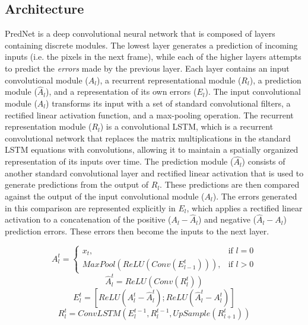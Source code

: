 \documentclass[12pt,twoside]{article}
\newif\myifpdf
\begin{document}
\subsection{Architecture}

PredNet is a deep convolutional neural network that is composed of layers containing discrete modules. The lowest layer generates a prediction of incoming inputs (i.e. the pixels in the next frame), while each of the higher layers attempts to predict the {\em errors} made by the previous layer. Each layer contains an input convolutional module ($A_l$), a recurrent representational module ($R_l$), a prediction module ($\hat{A}_l$), and a representation of its own errors ($E_l$). The input convolutional module ($A_l$) transforms its input with a set of standard convolutional filters, a rectified linear activation function, and a max-pooling operation. The recurrent representation module ($R_l$) is a convolutional LSTM, which is a recurrent convolutional network that replaces the matrix multiplications in the standard LSTM equations with convolutions, allowing it to maintain a spatially organized representation of its inputs over time. The prediction module ($\hat{A_l}$) consists of another standard convolutional layer and rectified linear activation that is used to generate predictions from the output of $R_l$. These predictions are then compared against the output of the input convolutional module ($A_l$). The errors generated in this comparison are represented explicitly in $E_l$, which applies a rectified linear activation to a concatenation of the positive ($A_l - \hat{A}_l$) and negative ($\hat{A}_l - A_l$) prediction errors. These errors then become the inputs to the next layer. 

\begin{equation}
A_l^t = 
\begin{cases}
    x_t, & \text{if } l = 0\\
    MaxPool(ReLU(Conv(E_{l-1}^t))), & \text{if } l > 0
\end{cases}
\end{equation}
\begin{equation}
\hat{A}_l^t = ReLU(Conv(R_l^t))
\end{equation}
\begin{equation}
E_l^t = [ReLU(A_l^t - \hat{A}_l^t); ReLU(\hat{A}_l^t - A_l^t)]
\end{equation}
\begin{equation}
R_l^t = ConvLSTM(E_l^{t-1},R_l^{t-1},UpSample(R_{l+1}^t))
\end{equation}
\end{document}
